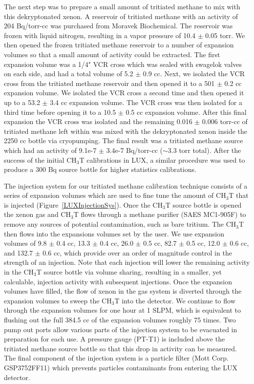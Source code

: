 The next step was to prepare a small amount of tritiated methane to mix with this dekryptonated xenon. A reservoir of tritiated methane with an activity of 204 Bq/torr-cc was purchased from Moravek Biochemical. The reservoir was frozen with liquid nitrogen, resulting in a vapor pressure of 10.4 $\pm$ 0.05 torr.  We then opened the frozen tritiated methane reservoir to a number of expansion volumes so that a small amount of activity could be extracted.  The first expansion volume was a 1/4" VCR cross which was sealed with swagelok valves on each side, and had a total volume of 5.2 $\pm$ 0.9 cc. Next, we isolated the VCR cross from the tritiated
methane reservoir and then opened it to a 501 $\pm$ 0.2 cc expansion volume. We isolated the VCR cross a second time and then opened it up to a 53.2 $\pm$ 3.4 cc expansion volume. The VCR cross was then isolated for a third time before opening it to a 10.5 $\pm$ 0.5 cc expansion volume. After this final expansion the VCR cross was isolated and the remaining 0.016 $\pm$ 0.006 torr-cc of tritiated methane left within was mixed with the dekryptonated xenon inside the 2250 cc bottle via cryopumping. The final result was a tritiated methane source which had an activity of 9.1e-7 $\pm$ 3.4e-7 Bq/torr-cc ($\sim$3.3 torr total).  After the success of the initial CH$_3$T calibrations in LUX, a similar procedure was used to produce a 300 Bq source bottle for higher statistics calibrations.

The injection system for our tritiated methane calibration technique consists of a series of expansion volumes which are used to fine tune the amount of CH$_3$T that is injected (Figure~\ref{LUXInjectionSys}). Once the CH$_3$T source bottle is opened the xenon gas and CH$_3$T flows through a methane purifier (SAES MC1-905F) to remove any sources of potential contamination, such as bare tritium. The CH$_3$T then flows into the expansions volumes set by the
user. We use expansion volumes of 9.8 $\pm$ 0.4 cc, 13.3 $\pm$ 0.4 cc, 26.0 $\pm$ 0.5 cc, 82.7 $\pm$ 0.5 cc, 12.0 $\pm$ 0.6 cc, and 132.7 $\pm$ 0.6 cc, which provide over an order of magnitude control in the strength of an injection. Note that each injection will lower the remaining activity in the CH$_3$T source bottle via volume sharing, resulting in a smaller, yet calculable, injection activity with subsequent injections. Once the expansion volumes
have filled, the flow of xenon in the gas system is diverted through the expansion volumes to sweep the CH$_3$T into the detector. We continue to flow through the expansion volumes for one hour at 1 SLPM, which is equivalent to flushing out the full 384.5 cc of the expansion volumes roughly 75 times. Two pump out ports allow various parts of the injection system to be evacuated in preparation for each use. A pressure gauge (PT-T1) is included above the tritiated methane source
bottle so that this drop in activity can be measured. The final component of the injection system is a particle filter (Mott Corp. GSP3752FF11) which prevents particles contaminants from entering the LUX detector.

